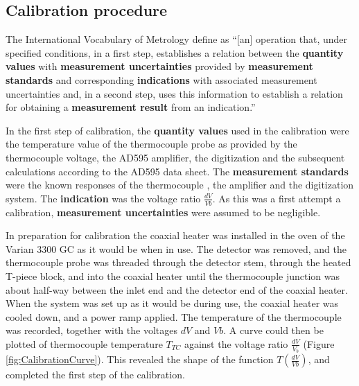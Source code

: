 \subsection{Calibration procedure}

The International Vocabulary of Metrology \autocite{JCGM200:2012} define
 as ``[an] operation that, under specified conditions, in a
first step, establishes a relation between the \textbf{quantity values} with
\textbf{measurement uncertainties} provided by \textbf{measurement standards}
and corresponding \textbf{indications} with associated measurement uncertainties
and, in a second step, uses this information to establish a relation for
obtaining a \textbf{measurement result} from an indication.''

In the first step of calibration, the \textbf{quantity values} used in the
calibration were the temperature value of the thermocouple probe as provided by
the thermocouple voltage, the AD595 amplifier, the digitization and the
subsequent calculations according to the AD595 data sheet. The
\textbf{measurement standards} were the known responses of the thermocouple
\autocite{Ripple1995}, the amplifier and the digitization system. The
\textbf{indication} was the voltage ratio \(\frac{dV}{Vb}\). As this was a first
attempt a calibration, \textbf{measurement uncertainties} were assumed to be
negligible.

In preparation for calibration the coaxial heater was installed in the oven of
the Varian 3300 GC as it would be when in use. The detector was removed, and the
thermocouple probe was threaded through the detector stem, through the heated
T-piece block, and into the coaxial heater until the thermocouple junction was
about half-way between the inlet end and the detector end of the coaxial heater.
When the system was set up as it would be during use, the coaxial heater was
cooled down, and a power ramp applied. The temperature of the thermocouple was
recorded, together with the voltages \(dV\) and \(Vb\). A curve could then be
plotted of thermocouple temperature \(T_{TC}\) against the voltage ratio \(
\frac{dV}{V_b} \) (Figure \ref{fig:CalibrationCurve}). This revealed the shape
of the function \(T(\frac{dV}{Vb})\), and completed the first step of the
calibration.

